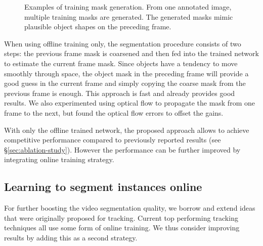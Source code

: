 \documentclass[10pt,twocolumn,letterpaper]{article}
\begin{document}
\begin{figure}
\begin{centering}
\hspace*{\fill}\hspace*{\fill}\hspace*{\fill}
\par\end{centering}
\caption{\label{fig:offline-augmentation}Examples of training mask generation.
From one annotated image, multiple training masks are generated. The generated masks mimic plausible object shapes on the preceding frame.
}
\vspace{-1em}
\end{figure}

When using offline training only, the segmentation procedure consists of two steps: the previous frame mask is coarsened and then fed into the trained network to estimate the current frame mask.
Since objects have a tendency to move smoothly through space, the object mask in the preceding frame will provide a good guess in the current frame
and simply copying the coarse mask from the previous frame is enough.
This approach is fast and already provides good results. We also experimented using optical flow to propagate the mask from one frame to the next, but found the optical flow errors to offset the gains.

With only the offline trained network, the proposed approach allows to achieve competitive performance compared to previously reported results (see \S\ref{sec:ablation-study}).
However the performance can be further improved by integrating online training strategy.

\subsection{Learning to segment instances online}
\label{sec:method-online}
For further boosting the video segmentation quality, we borrow and extend ideas that were originally proposed for tracking.
Current top performing tracking techniques \cite{Danelljan2016Eccv,Nam2016Cvpr} all use some form of online training. We thus consider improving results by adding this as a second strategy.
\end{document}
